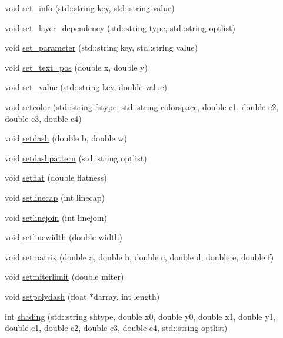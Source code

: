 \begin{DoxyCompactItemize}
void \hyperlink{classPDFlib_a1679bc2cdc767964fe19993032704c65}{set\+\_\+info} (std\+::string key, std\+::string value)
\item 
void \hyperlink{classPDFlib_a3bf3c45ea844c50c81d1e6d1a399f7cf}{set\+\_\+layer\+\_\+dependency} (std\+::string type, std\+::string optlist)
\item 
void \hyperlink{classPDFlib_abced8a3b9223a00e6a9fbf13aa2cf488}{set\+\_\+parameter} (std\+::string key, std\+::string value)
\item 
void \hyperlink{classPDFlib_a68aaa2b104cbeff66f28478c5503b71c}{set\+\_\+text\+\_\+pos} (double x, double y)
\item 
void \hyperlink{classPDFlib_a5fbc3e6d8843291ada8fabe40a106caf}{set\+\_\+value} (std\+::string key, double value)
\item 
void \hyperlink{classPDFlib_a45fca2a5dce286baa78e2394d83baa6f}{setcolor} (std\+::string fstype, std\+::string colorspace, double c1, double c2, double c3, double c4)
\item 
void \hyperlink{classPDFlib_a45e9138f953e972ab2f09f076d105c7b}{setdash} (double b, double w)
\item 
void \hyperlink{classPDFlib_a54c49fec034612feaf38fad5df9f76b7}{setdashpattern} (std\+::string optlist)
\item 
void \hyperlink{classPDFlib_a305e47f39351bc587c78c90cc4edabba}{setflat} (double flatness)
\item 
void \hyperlink{classPDFlib_a60623dfccc99a7fd09b12c9b585092db}{setlinecap} (int linecap)
\item 
void \hyperlink{classPDFlib_a2940808d00b87a16074c03a074057a17}{setlinejoin} (int linejoin)
\item 
void \hyperlink{classPDFlib_a383b08525b4c2acb9700e4e6e964a80a}{setlinewidth} (double width)
\item 
void \hyperlink{classPDFlib_a3a8cc387192e3a2d0eceb04b004328f0}{setmatrix} (double a, double b, double c, double d, double e, double f)
\item 
void \hyperlink{classPDFlib_a63946229c4ae1512d5533459192b9198}{setmiterlimit} (double miter)
\item 
void \hyperlink{classPDFlib_ac49a72864c82f10043e66ba6c1b5a0fb}{setpolydash} (float $\ast$darray, int length)
\item 
int \hyperlink{classPDFlib_afdd28cd764f222f1c102323a42657643}{shading} (std\+::string shtype, double x0, double y0, double x1, double y1, double c1, double c2, double c3, double c4, std\+::string optlist)
\item 

\end{DoxyCompactItemize}
